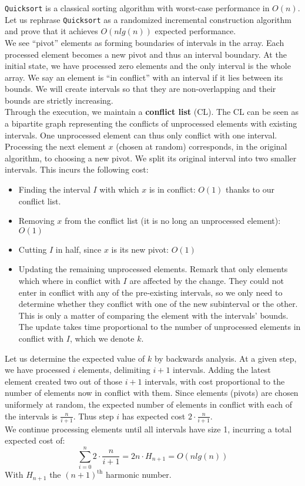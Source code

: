 
\texttt{Quicksort} is a classical sorting algorithm with worst-case performance in $O(n)$. Let us rephrase \texttt{Quicksort} as a randomized incremental construction algorithm and prove that it achieves $O(n lg(n))$ expected performance.\\

We see ``pivot'' elements as forming boundaries of intervals in the array. Each processed element becomes a new pivot and thus an interval boundary. At the initial state, we have processed zero elements and the only interval is the whole array. We say an element is ``in conflict'' with an interval if it lies between its bounds. We will create intervals so that they are non-overlapping and their bounds are strictly increasing.\\

Through the execution, we maintain a \textbf{conflict list} (CL). The CL can be seen as a bipartite graph representing the conflicts of unprocessed elements with existing intervals. One unprocessed element can thus only conflict with one interval.\\

Processing the next element $x$ (chosen at random) corresponds, in the original algorithm, to choosing a new pivot. We split its original interval into two smaller intervals. This incurs the following cost:
\begin{itemize}
  \item Finding the interval $I$ with which $x$ is in conflict: $O(1)$ thanks to our conflict list.
  \item Removing $x$ from the conflict list (it is no long an unprocessed element): $O(1)$
  \item Cutting $I$ in half, since $x$ is its new pivot: $O(1)$
  \item Updating the remaining unprocessed elements. Remark that only elements which where in conflict with $I$ are affected by the change. They could not enter in conflict with any of the pre-existing intervals, so we only need to determine whether they conflict with one of the new subinterval or the other. This is only a matter of comparing the element with the intervals' bounds. The update takes time proportional to the number of unprocessed elements in conflict with $I$, which we denote $k$.
\end{itemize}

Let us determine the expected value of $k$ by backwards analysis. At a given step, we have processed $i$ elements, delimiting $i+1$ intervals. Adding the latest element created two out of those $i+1$ intervals, with cost proportional to the number of elements now in conflict with them. Since elements (pivots) are chosen uniformely at random, the expected number of elements in conflict with each of the intervals is $\frac{n}{i+1}$. Thus step $i$ has expected cost $2 \cdot \frac{n}{i+1}$.\\

We continue processing elements until all intervals have size 1, incurring a total expected cost of:
\[
  \sum_{i=0}^n {2 \cdot \frac{n}{i+1}} = 2n \cdot H_{n+1} = O(n lg(n))
\]
With $H_{n+1}$ the $(n+1)^\text{th}$ harmonic number.
